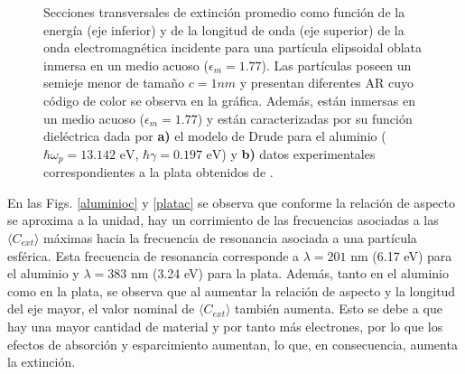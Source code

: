 \begin{figure}[h!]
	\quad%
	\caption{Secciones transversales de extinción promedio como función de la energía (eje inferior) y de la longitud de onda (eje superior) de la onda electromagnética incidente para una partícula elipsoidal oblata inmersa en un medio acuoso ($\epsilon_m=1.77$). Las partículas  poseen un semieje menor de tamaño $c=1nm$ y presentan diferentes AR cuyo código de color se observa en la gráfica. Además, están inmersas en un medio acuoso ($\epsilon_m=1.77$) y están caracterizadas por su función dieléctrica dada por  \textbf{a)} el modelo de Drude para el aluminio ($\hbar\omega_p=13.142\text{ eV}$, $\hbar\gamma=0.197\text{ eV}$) y \textbf{b)} datos experimentales correspondientes a la plata obtenidos de \cite{Plata}.}\label{aluminioplatac}
\end{figure} 

 En las Figs. \ref{aluminioc}  y \ref{platac} se observa que conforme la relación de aspecto se aproxima a la unidad, hay un corrimiento de las frecuencias asociadas a las $\langle C_{ext}\rangle$ máximas hacia la frecuencia de resonancia asociada a una partícula esférica. Esta frecuencia de resonancia corresponde a $\lambda=201\text{ nm}$ (6.17 eV) para el aluminio y $\lambda=383\text{ nm}$ (3.24 eV) para la plata. Además, tanto en el aluminio como en la plata, se observa que al aumentar la relación de aspecto y la longitud del eje mayor, el valor nominal de  $\langle C_{ext}\rangle$ también aumenta. Esto se debe a que hay una mayor cantidad de material y por tanto más electrones, por lo que los efectos de absorción y esparcimiento aumentan, lo que, en consecuencia, aumenta la extinción.



